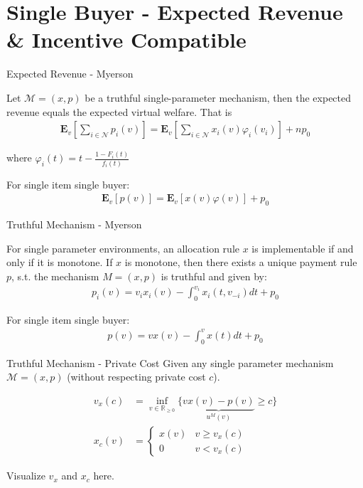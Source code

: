 \documentclass{beamer}
\begin{document}
\section{Single Buyer - Expected Revenue \& Incentive Compatible}

\begin{frame}{Expected Revenue - Myerson}
  \begin{lemma}
    Let $\mathcal{M}=(x,p)$ be a truthful single-parameter mechanism, then the expected revenue equals the expected virtual welfare. That is
    \begin{align*}
      \mathbf{E}_v\left[\sum_{i \in \mathcal{N}}p_i(v)\right]
      = \mathbf{E}_v\left[\sum_{i \in \mathcal{N}}x_i(v)\varphi_i(v_i)\right] + n p_0
    \end{align*}

    where $\varphi_i(t) = t - \frac{1 - F_i(t)}{f_i(t)}$
  \end{lemma}

  For single item single buyer:
  \begin{align*}
    \mathbf{E}_v\left[p(v)\right]
    = \mathbf{E}_v\left[x(v)\varphi(v)\right] + p_0
  \end{align*}
\end{frame}

\begin{frame}{Truthful Mechanism - Myerson}
  \begin{lemma}
    For single parameter environments, an allocation rule $x$ is implementable if and only if it is monotone.
    If $x$ is monotone, then there exists a unique payment rule $p$, s.t. the mechanism $M=(x,p)$ is truthful
    and given by:
    \begin{align*}
      p_i(v) = v_i x_i(v) - \int_0^{v_i} x_i(t,v_{-i})dt + p_0
    \end{align*}
  \end{lemma}

  For single item single buyer:
  \begin{align*}
    p(v) = v x(v) - \int_0^v x(t) dt + p_0
  \end{align*}
\end{frame}

\begin{frame}{Truthful Mechanism - Private Cost}
  Given any single parameter mechanism $\mathcal{M} = (x,p)$ (without respecting private cost $c$).

  \begin{align*}
    v_x(c) & = \inf_{v \in \mathbb{R}_{\geq 0}} \{\underbrace{v x(v) - p(v)}_{u^M(v)} \geq c\} \\
    x_c(v) & = \begin{cases}
                 x(v) & v \geq v_x(c) \\
                 0    & v < v_x(c)
               \end{cases}
  \end{align*}

  Visualize $v_x$ and $x_c$ here.
\end{frame}
\end{document}
